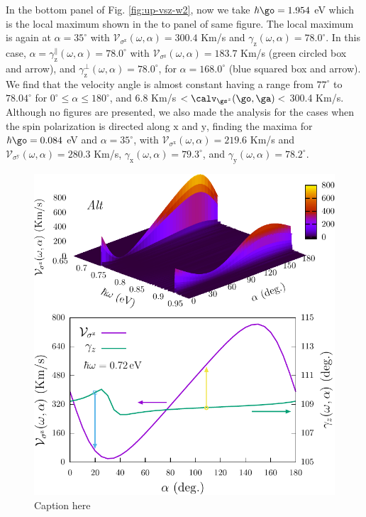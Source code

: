 \documentclass[prb,11pt,tightenlines,twocolumn,aps]{revtex4-1}
\begin{document}
In the bottom panel of Fig. \ref{fig:up-vsz-w2}, now we take
$\hbar\go=1.954$ eV which is the local maximum 
shown in the to panel of same figure. 
The local maximum is
again at  $\alpha = 35^{\circ}$ with
$\mathcal{V}_{\sigma^{\mathrm{z}}} (\omega,\alpha) =
300.4$ Km/s and $\gamma_{\mathrm{z}}(\omega,\alpha) =
78.0^{\circ}$.
% 
In this case, $\alpha =\gamma_{\mathrm{z}}^\parallel(\omega,\alpha) =
78.0^{\circ}$ with $\mathcal{V}_{\sigma^{\mathrm{z}}}(\omega,\alpha) =183.7$
Km/s (green circled box and arrow), and
$\gamma_{\mathrm{z}}^\perp(\omega,\alpha) = 78.0^{\circ}$, for $\alpha =168.0^
{\circ}$ (blue squared box and arrow).
% 
We find  that the velocity angle is almost constant having a range from
$77^{\circ}$ to $78.04^{\circ}$ for  $0^{\circ} \leq
\alpha \leq 180^{\circ}$, and 6.8 Km/s $<\calv_{\gs^z}(\go,\ga)<$ 300.4 Km/s.
% 
Although no figures are presented, we also made the analysis for the
cases when the spin polarization is directed 
along $\mathrm{x}$ and $\mathrm{y}$, finding 
the maxima for
$\hbar\go=0.084$ eV and $\alpha=35^{\circ}$, with
$\mathcal{V}_{\sigma^{\mathrm{x}}}(\omega,\alpha)=219.6$ Km/s and
$\mathcal{V}_{\sigma^{\mathrm{y}}}(\omega,\alpha)=280.3$ Km/s,
$\gamma_{\mathrm{x}}(\omega,\alpha) = 79.3^{\circ}$, and 
$\gamma_{\mathrm{y}}(\omega,\alpha) = 78.2^{\circ}$.


\begin{figure}[tb]
    \centering
    \includegraphics[width=\linewidth]{altplots/alt-vsz}
    \caption{Caption here}
    \label{fig:alt-vsz}
\end{figure}
\end{document}
